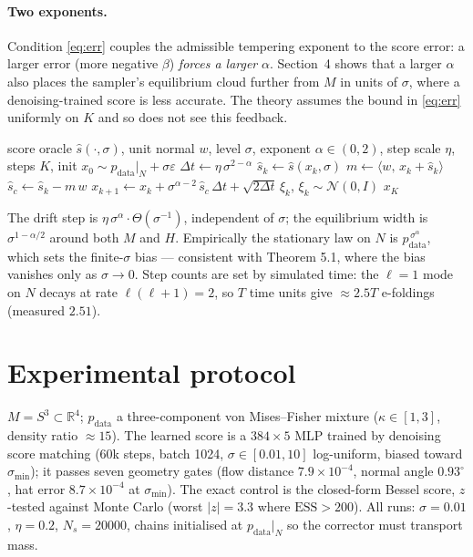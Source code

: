 \documentclass[10pt]{article}
\theoremstyle{definition}
\theoremstyle{plain}
\newcommand{\shat}{\hat{s}}
\newcommand{\pdata}{p_{\mathrm{data}}}
\newcommand{\R}{\mathbb{R}}
\begin{document}
\paragraph{Two exponents.} Condition \eqref{eq:err} couples the admissible
tempering exponent to the score error: a larger error (more negative $\beta$)
\emph{forces a larger} $\alpha$. Section~4 shows that a larger $\alpha$ also
places the sampler's equilibrium cloud further from $M$ in units of $\sigma$,
where a denoising-trained score is less accurate. The theory assumes the bound
in \eqref{eq:err} uniformly on $K$ and so does not see this feedback.

\begin{algorithm}[t]
\caption{Tempered guided Langevin corrector (this work)}
\label{alg:corrector}
\begin{algorithmic}[1]
\Require score oracle $\shat(\cdot,\sigma)$, unit normal $w$, level $\sigma$,
  exponent $\alpha \in (0,2)$, step scale $\eta$, steps $K$,
  init $x_0 \sim \pdata|_N + \sigma\varepsilon$
\State $\Delta t \gets \eta\, \sigma^{2-\alpha}$
  \State $\shat_k \gets \shat(x_k,\sigma)$
  \State $m \gets \langle w,\, x_k + \shat_k \rangle$
  \State $\shat_c \gets \shat_k - m\,w$
  \State $x_{k+1} \gets x_k + \sigma^{\alpha-2}\,\shat_c\,\Delta t
     + \sqrt{2\Delta t}\,\xi_k$, \quad $\xi_k \sim \mathcal{N}(0,I)$
\EndFor
\State \Return $x_K$
\end{algorithmic}
\end{algorithm}

\noindent
The drift step is $\eta\,\sigma^{\alpha}\!\cdot\!\Theta(\sigma^{-1})$,
independent of $\sigma$; the equilibrium width is $\sigma^{1-\alpha/2}$ around
both $M$ and $H$. Empirically the stationary law on $N$ is
$\pdata^{\,\sigma^\alpha}$, which sets the finite-$\sigma$ bias --- consistent
with Theorem 5.1, where the bias vanishes only as $\sigma \to 0$. Step counts
are set by simulated time: the $\ell=1$ mode on $N$ decays at rate
$\ell(\ell+1)=2$, so $T$ time units give ${\approx}2.5T$ e-foldings (measured
$2.51$).

\section{Experimental protocol}

$M = S^3 \subset \R^4$; $\pdata$ a three-component von Mises--Fisher mixture
($\kappa \in [1,3]$, density ratio ${\approx}15$). The learned score is a
$384{\times}5$ MLP trained by denoising score matching (60k steps, batch 1024,
$\sigma \in [0.01,10]$ log-uniform, biased toward $\sigma_{\min}$); it passes
seven geometry gates (flow distance $7.9{\times}10^{-4}$, normal angle
$0.93^\circ$, hat error $8.7{\times}10^{-4}$ at $\sigma_{\min}$). The exact
control is the closed-form Bessel score, $z$-tested against Monte Carlo (worst
$|z| = 3.3$ where $\mathrm{ESS}>200$). All runs: $\sigma = 0.01$, $\eta = 0.2$,
$N_s = 20000$, chains initialised at $\pdata|_N$ so the corrector must transport
mass.
\end{document}

